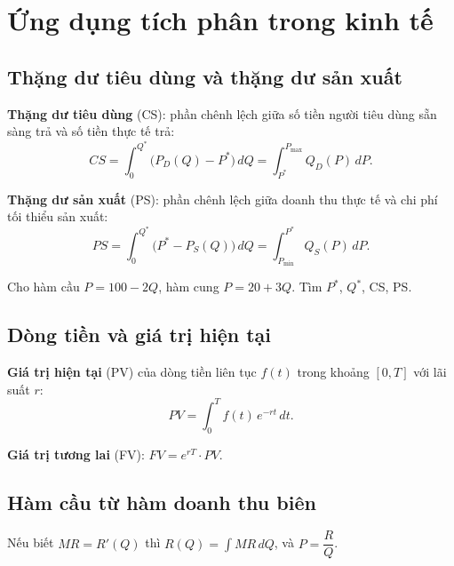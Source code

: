 \documentclass[12pt,a4paper]{article}
\begin{document}
\section{Ứng dụng tích phân trong kinh tế}

\subsection{Thặng dư tiêu dùng và thặng dư sản xuất}

\begin{dinhnghia}
  \textbf{Thặng dư tiêu dùng} (CS): phần chênh lệch giữa số tiền người tiêu dùng sẵn sàng trả và số tiền thực tế trả:
  \[
    CS = \int_0^{Q^*} \bigl(P_D(Q) - P^*\bigr)\,dQ = \int_{P^*}^{P_{\max}} Q_D(P)\,dP.
  \]
\end{dinhnghia}

\begin{dinhnghia}
  \textbf{Thặng dư sản xuất} (PS): phần chênh lệch giữa doanh thu thực tế và chi phí tối thiểu sản xuất:
  \[
    PS = \int_0^{Q^*} \bigl(P^* - P_S(Q)\bigr)\,dQ = \int_{P_{\min}}^{P^*} Q_S(P)\,dP.
  \]
\end{dinhnghia}

\begin{vidu}
  Cho hàm cầu $P = 100 - 2Q$, hàm cung $P = 20 + 3Q$. Tìm $P^*$, $Q^*$, CS, PS.
\end{vidu}

\subsection{Dòng tiền và giá trị hiện tại}

\begin{dinhnghia}
  \textbf{Giá trị hiện tại} (PV) của dòng tiền liên tục $f(t)$ trong khoảng $[0,T]$ với lãi suất $r$:
  \[
    PV = \int_0^T f(t)\,e^{-rt}\,dt.
  \]
\end{dinhnghia}

\begin{dinhnghia}
  \textbf{Giá trị tương lai} (FV): $FV = e^{rT} \cdot PV$.
\end{dinhnghia}

\subsection{Hàm cầu từ hàm doanh thu biên}

\begin{phuongphap}
  Nếu biết $MR = R'(Q)$ thì $R(Q) = \displaystyle\int MR\,dQ$, và $P = \dfrac{R}{Q}$.
\end{phuongphap}
\end{document}
